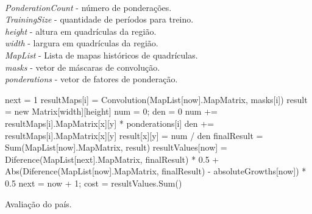 \vspace{10px}
\begin{algorithm}[h]
\SetAlgoLined
\KwData
{
\\ \emph{PonderationCount} - número de ponderações.
\\ \emph{TrainingSize} - quantidade de períodos para treino.
\\ \emph{height} - altura em quadrículas da região.
\\ \emph{width} - largura em quadrículas da região.
\\ \emph{MapList} - Lista de mapas históricos de quadrículas.
\\ \emph{masks} - vetor de máscaras de convolução.
\\ \emph{ponderations} - vetor de fatores de ponderação. 
}

next = 1\;
{
    {
    	resultMaps[i] = Convolution(MapList[now].MapMatrix, masks[i])\;
    }
    result = new Matrix[width][height]\;
    {
        {
          num = 0; den = 0\;
          {
			num += resultMaps[i].MapMatrix[x][y] * ponderations[i]\;
            den += resultMaps[i].MapMatrix[x][y]\;
          }
          result[x][y] = num / den\;
        }
    }
    finalResult = Sum(MapList[now].MapMatrix, result)\;
    resultValues[now] = Diference(MapList[next].MapMatrix, finalResult) * 0.5 + Abs(Diference(MapList[now].MapMatrix, finalResult) - absoluteGrowths[now]) * 0.5\;
    next = now + 1;
}
cost = resultValues.Sum()\;
\caption{ Avaliação do país.}
\label{alg:CountryEval}
\end{algorithm}

